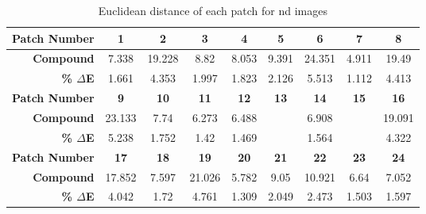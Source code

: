 \begin{table}[H]
  \caption{Euclidean distance of each patch for nd images }
  \begin{center}
    \begin{tabularx}{\textwidth}{r c c c c c c c c}
    \toprule
        \textbf{Patch Number} & \textbf{1} & \textbf{2} & \textbf{3} & \textbf{4} & \textbf{5} & \textbf{6} & \textbf{7} & \textbf{8}\\ \midrule 
        \textbf{Compound} &7.338 &19.228 &8.82 &8.053 &9.391 &24.351 &4.911 &19.49\\ 
        \textbf{\textbf{\% $\Delta$E}} &1.661 &4.353 &1.997 &1.823 &2.126 &5.513 &1.112 &4.413\\ \midrule 
        \textbf{Patch Number} & \textbf{9} & \textbf{10} & \textbf{11} & \textbf{12} & \textbf{13} & \textbf{14} & \textbf{15} & \textbf{16}\\ \midrule 
        \textbf{Compound} &23.133 &7.74 &6.273 &6.488 &\cellcolor{colorgreen}{4.607} &6.908 &\cellcolor{colorred}{29.981} &19.091\\ 
        \textbf{\textbf{\% $\Delta$E}} &5.238 &1.752 &1.42 &1.469 &\cellcolor{colorgreen}{1.043} &1.564 &\cellcolor{colorred}{6.788} &4.322\\ \midrule 
        \textbf{Patch Number} & \textbf{17} & \textbf{18} & \textbf{19} & \textbf{20} & \textbf{21} & \textbf{22} & \textbf{23} & \textbf{24}\\ \midrule 
        \textbf{Compound} &17.852 &7.597 &21.026 &5.782 &9.05 &10.921 &6.64 &7.052\\ 
        \textbf{\textbf{\% $\Delta$E}} &4.042 &1.72 &4.761 &1.309 &2.049 &2.473 &1.503 &1.597\\ \midrule 
    \bottomrule
    \end{tabularx}
  \end{center}
\end{table}
